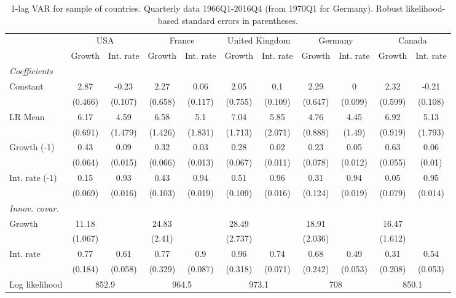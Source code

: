 \begin{table}[htbp] 
	\centering
	 \scriptsize
	\begin{tabular}{@{\extracolsep{4pt}}lcccccccccc@{}}		\hline\hline
		 		 & \multicolumn{2}{c}{USA} &\multicolumn{2}{c}{France} &\multicolumn{2}{c}{United Kingdom} &\multicolumn{2}{c}{Germany} &\multicolumn{2}{c}{Canada} \\ 
 		 & Growth 	 & Int. rate 	 & Growth 	 & Int. rate 	 & Growth 	 & Int. rate 	 & Growth 	 & Int. rate 	 & Growth 	 & Int. rate\\\cline{2-3}\cline{4-5}\cline{6-7}\cline{8-9}\cline{10-11}
\rule{0pt}{4ex} 
 \emph{Coefficients} 	  		 & 		 & 		 & 		 & 		 & 		 & 		 & 		 & 		 & 		 &\\ 
\quad Constant 	 & 2.87 	 & -0.23 	 & 2.27 	 & 0.06 	 & 2.05 	 & 0.1 	 & 2.29 	 & 0 	 & 2.32 	 & -0.21	 \\ 
 		 & (0.466) 	 & (0.107) 	 & (0.658) 	 & (0.117) 	 & (0.755) 	 & (0.109) 	 & (0.647) 	 & (0.099) 	 & (0.599) 	 & (0.108) 	 \\ 
\quad LR Mean 	 & 6.17 	 & 4.59 	 & 6.58 	 & 5.1 	 & 7.04 	 & 5.85 	 & 4.76 	 & 4.45 	 & 6.92 	 & 5.13	 \\ 
 		 & (0.691) 	 & (1.479) 	 & (1.426) 	 & (1.831) 	 & (1.713) 	 & (2.071) 	 & (0.888) 	 & (1.49) 	 & (0.919) 	 & (1.793) 	 \\ 
\quad Growth (-1) 	 &0.43 	 & 0.09 	 & 0.32 	 & 0.03 	 & 0.28 	 & 0.02 	 & 0.23 	 & 0.05 	 & 0.63 	 & 0.06	 \\ 
 		 & (0.064) 	 & (0.015) 	 & (0.066) 	 & (0.013) 	 & (0.067) 	 & (0.011) 	 & (0.078) 	 & (0.012) 	 & (0.055) 	 & (0.01) 	 \\ 
\quad Int. rate (-1) 	 &0.15 	 & 0.93 	 & 0.43 	 & 0.94 	 & 0.51 	 & 0.96 	 & 0.31 	 & 0.94 	 & 0.05 	 & 0.95	 \\ 
 		 & (0.069) 	 & (0.016) 	 & (0.103) 	 & (0.019) 	 & (0.109) 	 & (0.016) 	 & (0.124) 	 & (0.019) 	 & (0.079) 	 & (0.014) 	 \\ 
\rule{0pt}{4ex} \emph{Innov. covar.}  	 & 	 & 	 & 	 & 	 & 	 & 	 & 	 & 	 & 	 &\\ 
\quad Growth 	 &11.18 	 &  	 & 24.83 	 &  	 & 28.49 	 &  	 & 18.91 	 &  	 & 16.47 	 & 	 \\ 
 		 & (1.067) 	 &  	 & (2.41) 	 &  	 & (2.737) 	 &  	 & (2.036) 	 &  	 & (1.612) 	 &  	 \\ 
\quad Int. rate 	 &0.77 	 & 0.61 	 & 0.77 	 & 0.9 	 & 0.96 	 & 0.74 	 & 0.68 	 & 0.49 	 & 0.31 	 & 0.54	 \\ 
 		 & (0.184) 	 & (0.058) 	 & (0.329) 	 & (0.087) 	 & (0.318) 	 & (0.071) 	 & (0.242) 	 & (0.053) 	 & (0.208) 	 & (0.053) 	 \\ 
 \hline \rule{0pt}{4ex} 
  Log likelihood 	 &\multicolumn{2}{c}{852.9} 	 & \multicolumn{2}{c}{964.5} 	 & \multicolumn{2}{c}{973.1} 	 & \multicolumn{2}{c}{708} 	 & \multicolumn{2}{c}{850.1}\\ 

 \hline 	\end{tabular}		\caption{1-lag VAR for sample of countries. Quarterly data 1966Q1-2016Q4
                      (from 1970Q1 for Germany). Robust likelihood-based
                      standard errors in parentheses.}
		\label{tab:all_1lag}

\end{table}
